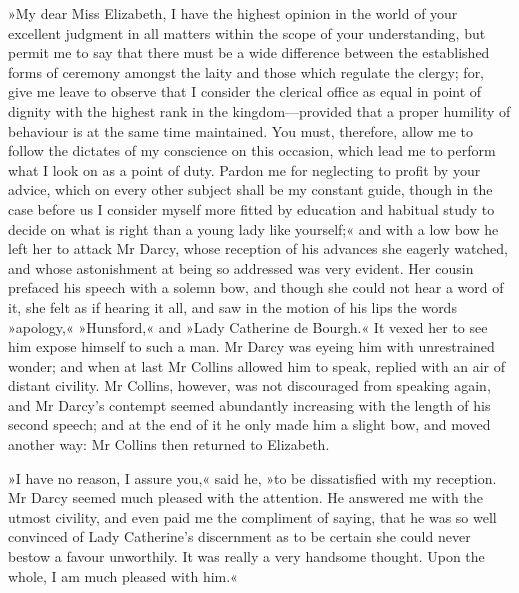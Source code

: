 »My dear Miss Elizabeth, I have the highest opinion in the world of your excellent judgment in all matters within the scope of your understanding, but permit me to say that there must be a wide difference between the established forms of ceremony amongst the laity and those which regulate the clergy; for, give me leave to observe that I consider the clerical office as equal in point of dignity with the highest rank in the kingdom—provided that a proper humility of behaviour is at the same time maintained. You must, therefore, allow me to follow the dictates of my conscience on this occasion, which lead me to perform what I look on as a point of duty. Pardon me for neglecting to profit by your advice, which on every other subject shall be my constant guide, though in the case before us I consider myself more fitted by education and habitual study to decide on what is right than a young lady like yourself;« and with a low bow he left her to attack Mr Darcy, whose reception of his advances she eagerly watched, and whose astonishment at being so addressed was very evident. Her cousin prefaced his speech with a solemn bow, and though she could not hear a word of it, she felt as if hearing it all, and saw in the motion of his lips the words »apology,« »Hunsford,« and »Lady Catherine de Bourgh.« It vexed her to see him expose himself to such a man. Mr Darcy was eyeing him with unrestrained wonder; and when at last Mr Collins allowed him to speak, replied with an air of distant civility. Mr Collins, however, was not discouraged from speaking again, and Mr Darcy's contempt seemed abundantly increasing with the length of his second speech; and at the end of it he only made him a slight bow, and moved another way: Mr Collins then returned to Elizabeth.

»I have no reason, I assure you,« said he, »to be dissatisfied with my reception. Mr Darcy seemed much pleased with the attention. He answered me with the utmost civility, and even paid me the compliment of saying, that he was so well convinced of Lady Catherine's discernment as to be certain she could never bestow a favour unworthily. It was really a very handsome thought. Upon the whole, I am much pleased with him.«

